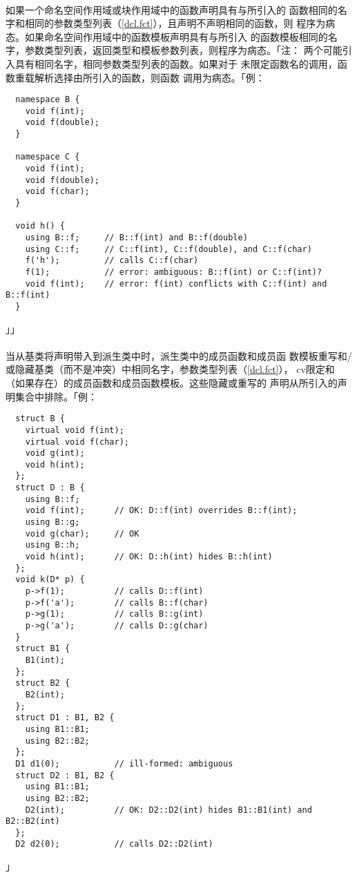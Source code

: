 \paragraph{}
如果一个命名空间作用域或块作用域中的函数声明具有与所引入的
函数相同的名字和相同的参数类型列表（\ref{dcl.fct}），且声明不声明相同的函数，则
程序为病态。如果命名空间作用域中的函数模板声明具有与所引入
的函数模板相同的名字，参数类型列表，返回类型和模板参数列表，则程序为病态。「注：
两个可能引入具有相同名字，相同参数类型列表的函数。如果对于
未限定函数名的调用，函数重载解析选择由所引入的函数，则函数
调用为病态。「例：
\begin{lstlisting}
  namespace B {
    void f(int);
    void f(double);
  }

  namespace C {
    void f(int);
    void f(double);
    void f(char);
  }

  void h() {
    using B::f;     // B::f(int) and B::f(double)
    using C::f;     // C::f(int), C::f(double), and C::f(char)
    f('h');         // calls C::f(char)
    f(1);           // error: ambiguous: B::f(int) or C::f(int)?
    void f(int);    // error: f(int) conflicts with C::f(int) and B::f(int)
  }
\end{lstlisting}」」

\paragraph{}
当从基类将声明带入到派生类中时，派生类中的成员函数和成员函
数模板重写和/或隐藏基类（而不是冲突）中相同名字，参数类型列表（\ref{dcl.fct}），
cv限定和（如果存在）的成员函数和成员函数模板。这些隐藏或重写的
声明从所引入的声明集合中排除。「例：
\begin{lstlisting}
  struct B {
    virtual void f(int);
    virtual void f(char);
    void g(int);
    void h(int);
  };
  struct D : B {
    using B::f;
    void f(int);      // OK: D::f(int) overrides B::f(int);
    using B::g;
    void g(char);     // OK
    using B::h;
    void h(int);      // OK: D::h(int) hides B::h(int)
  };
  void k(D* p) {
    p->f(1);          // calls D::f(int)
    p->f('a');        // calls B::f(char)
    p->g(1);          // calls B::g(int)
    p->g('a');        // calls D::g(char)
  }
  struct B1 {
    B1(int);
  };
  struct B2 {
    B2(int);
  };
  struct D1 : B1, B2 {
    using B1::B1;
    using B2::B2;
  };
  D1 d1(0);           // ill-formed: ambiguous
  struct D2 : B1, B2 {
    using B1::B1;
    using B2::B2;
    D2(int);          // OK: D2::D2(int) hides B1::B1(int) and B2::B2(int)
  };
  D2 d2(0);           // calls D2::D2(int)
\end{lstlisting}」

